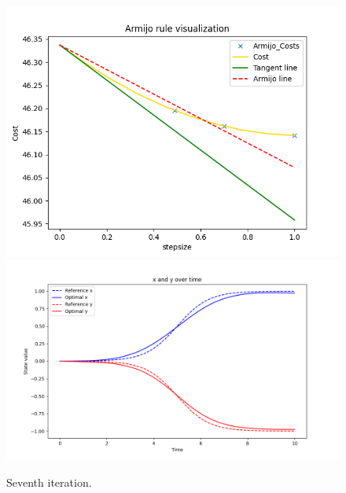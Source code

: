 \begin{figure}[H]
  \centering
  \includegraphics[width=1\textwidth]{pictures/Figure_3_1.png}\hfill\\
  \includegraphics[width=1\textwidth]{pictures/Figure_3_2.png}\hfill
  \caption{Seventh iteration.}
  \label{fig:Reference trajectory}
\end{figure}

